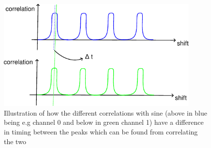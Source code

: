\begin{figure}
	\centering
	\includegraphics[width=0.9\textwidth]{figures/IlluCorr.pdf}
	\caption{Illustration of how the different correlations with sine (above
	in blue being e.g channel 0 and below in green channel 1) have a difference
in timing between the peaks which can be found from correlating the two}
	\label{fig:CorrIllu}
\end{figure}
